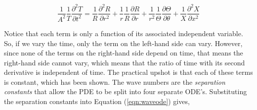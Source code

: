 





\begin{equation}
    \frac{1}{A^2} \frac{1}{T}\frac{\partial^2 T}{\partial t^2} = 
    \frac{1}{R}\frac{\partial^2 R}{\partial r^2 } +
    \frac{1}{r}\frac{1}{R}\frac{\partial R}{\partial r}  + 
    \frac{1}{r^2}\frac{1}{\Theta}\frac{\partial \Theta}{\partial \theta} + 
    \frac{1}{X}\frac{\partial^2 X}{\partial x^2}
    \label{eqn:waveode}
\end{equation}

Notice that each term is only a function of its associated independent variable.
So, if we vary the time, only the term on the left-hand side can vary. However,
since none of the terms on the right-hand side depend on time, that means the
right-hand side cannot vary, which means that the ratio of time with its second
derivative is independent of time. The practical upshot is that each of these 
terms is constant, which has been shown. The wave numbers are the \textit{separation constants} 
that allow the PDE to be split into four separate ODE's. Substituting the separation constants 
into Equation (\ref{eqn:waveode}) gives, 


